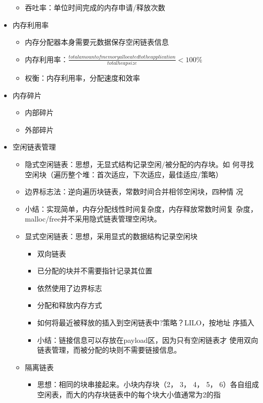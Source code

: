 \documentclass[a4paper, 11pt]{article}
\begin{document}
\begin{itemize}
\begin{itemize}
			\item{吞吐率：单位时间完成的内存申请/释放次数}
			\end{itemize}
		  \item{内存利用率}
			\begin{itemize}
			  \item{内存分配器本身需要元数据保存空闲链表信息}
			  \item{内存利用率：$\frac{total amount of memory allocated to the
				application}{total heap size} < 100\%$}
			  \item{权衡：内存利用率，分配速度和效率}
			  \end{itemize}
			\item{内存碎片}
			  \begin{itemize}
				\item{内部碎片}
				\item{外部碎片}
				\end{itemize}
			\item{空闲链表管理}
			  \begin{itemize}
				\item{隐式空闲链表：思想，无显式结构记录空闲/被分配的内存块。如
				  何寻找空闲块（遍历整个堆：首次适应，下次适应，最佳适应/策略）}
				\item{边界标志法：逆向遍历块链表，常数时间合并相邻空闲块，四种情
				  况}
				\item{小结：实现简单，内存分配线性时间复杂度，内存释放常数时间复
				  杂度，malloc/free并不采用隐式链表管理空闲块。}
				\item{显式空闲链表：思想，采用显式的数据结构记录空闲块}
				  \begin{itemize}
					\item{双向链表}
					\item{已分配的块并不需要指针记录其位置}
					\item{依然使用了边界标志}
					\item{分配和释放内存方式}
					\item{如何将最近被释放的插入到空闲链表中?策略？LILO，按地址
					  序插入}
					\item{小结：链接信息可以存放在payload区，因为只有空闲链表才
					  使用双向链表管理，而被分配的块则不需要链接信息。}
					\end{itemize}
				  \item{隔离链表}
					\begin{itemize}
					  \item{思想：相同的块串接起来。小块内存块（2， 3， 4， 5，
						6）各自组成空闲表，而大的内存块链表中的每个块大小值通常为2的指
}
\end{itemize}
\end{itemize}
\end{itemize}
\end{document}
